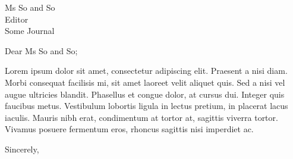 \documentclass[xelatex]{GnuLetter}
\begin{document}
\begin{letter}{
Ms So and So \\  
Editor\\
Some Journal
}


\opening{Dear Ms So and So;} 


Lorem ipsum dolor sit amet, consectetur adipiscing elit. Praesent a nisi diam. Morbi consequat facilisis mi, sit amet laoreet velit aliquet quis. Sed a nisi vel augue ultricies blandit. Phasellus et congue dolor, at cursus dui. Integer quis faucibus metus. Vestibulum lobortis ligula in lectus pretium, in placerat lacus iaculis. Mauris nibh erat, condimentum at tortor at, sagittis viverra tortor. Vivamus posuere fermentum eros, rhoncus sagittis nisi imperdiet ac.



\closing{Sincerely,}

\end{letter}
\end{document}
